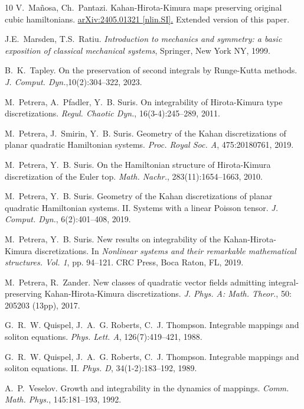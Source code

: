\documentclass[11pt]{article}
\begin{document}
\begin{thebibliography}{10}
  V.~Ma\~{n}osa, Ch.~Pantazi. Kahan-Hirota-Kimura maps preserving original cubic hamiltonians.  \href{https://arxiv.org/abs/2405.01321}{arXiv:2405.01321 [nlin.SI].} Extended version of this paper.

 J.E.~Marsden, T.S.~Ratiu.
{\em Introduction to mechanics and symmetry: a basic exposition of classical mechanical systems},
Springer, New York NY, 1999.

 B.~K.~Tapley. On the preservation of second integrals by Runge-Kutta methods.  {\em J. Comput. Dyn.},10(2):304--322, 2023.

M.~Petrera, A.~Pfadler, Y.~B. Suris.
 On integrability of {H}irota-{K}imura type discretizations.
 {\em Regul. Chaotic Dyn.}, 16(3-4):245--289, 2011.

M.~Petrera, J.~Smirin, Y.~B. Suris.
 Geometry of the {K}ahan discretizations of planar quadratic
  {H}amiltonian systems.
 {\em Proc. Royal Soc. A}, 475:20180761, 2019.

 M.~Petrera, Y.~B. Suris. On the Hamiltonian structure of Hirota-Kimura discretization of the Euler top. {\em Math. Nachr.}, 283(11):1654--1663, 2010.

M.~Petrera, Y.~B. Suris.
 Geometry of the {K}ahan discretizations of planar quadratic
  {H}amiltonian systems. {II}. {S}ystems with a linear {P}oisson tensor.
 {\em J. Comput. Dyn.}, 6(2):401--408, 2019.

M.~Petrera, Y.~B. Suris.
 New results on integrability of the {K}ahan-{H}irota-{K}imura
  discretizations.
 In {\em Nonlinear systems and their remarkable mathematical
  structures. {V}ol. 1}, pp. 94--121. CRC Press, Boca Raton, FL, 2019.
  
  
 M.~Petrera, R.~Zander.  New classes of quadratic vector fields admitting integral-preserving Kahan-Hirota-Kimura discretizations. {\em J. Phys. A: Math. Theor.}, 50: 205203 (13pp), 2017.

G.~R.~W. Quispel, J.~A.~G. Roberts, C.~J. Thompson.
 Integrable mappings and soliton equations.
 {\em Phys. Lett. A}, 126(7):419--421, 1988.

G.~R.~W. Quispel, J.~A.~G. Roberts, C.~J. Thompson.
 Integrable mappings and soliton equations. {II}.
 {\em Phys. D}, 34(1-2):183--192, 1989.
 


 A.~P.~Veselov. Growth and integrability in the dynamics of mappings. {\em Comm. Math. Phys.}, 145:181--193, 1992.

\end{thebibliography}
\end{document}
